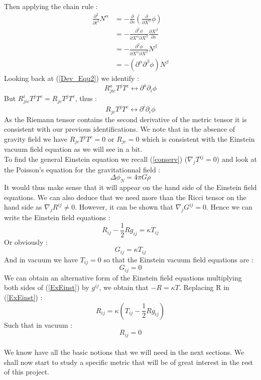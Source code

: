 \documentclass[a4paper,12pt]{article}
\theoremstyle{definition}
\begin{document}
Then applying the chain rule :
\begin{equation}
\begin{split}
	\frac{\partial^2}{\partial t^2}N^\alpha&=-\frac{\partial}{\partial s}(\frac{\partial}{\partial X^\alpha}\phi)\\
	&=-\frac{\partial^2\phi}{\partial X^\alpha\partial X^\beta}\frac{\partial X^\beta}{\partial s}\\
	&=-\frac{\partial^2\phi}{\partial X^\alpha\partial X^\beta}N^\beta\\
	&=-(\partial^\alpha \partial^\beta \phi)N^\beta
\end{split}
\end{equation}
Looking back at (\ref{Dev_Equ2}) we identify :
\begin{equation}
	R_{jic}^aT^jT^c\longleftrightarrow \partial^a \partial_i \phi
\end{equation}
But $R_{jic}^iT^jT^c=R_{jc}T^jT^c$, thus :
\begin{equation}
	R_{jc}T^jT^c\longleftrightarrow \partial^i \partial_i \phi
\end{equation}
As the Riemann tensor contains the second derivative of the metric tensor it is consistent with our previous identifications.
We note that in the absence of gravity field we have $R_{jc}T^jT^c=0$ or $R_{jc}=0$ which is consistent with the Einstein vacuum field equation as we will see in a bit.\\
To find the general Einstein equation we recall (\ref{conserv}) ($\nabla_j T^{ij}=0$) and look at the Poisson's equation for the gravitationnal field :
\begin{equation}
	\Delta\phi_N=4\pi G\rho
\end{equation}
It would thus make sense that it will appear on the hand side of the Einstein field equations.
We can also deduce that we need more than the Ricci tensor on the hand side as $\nabla_j R^{ij}\ne0$.
However, it can be shown that $\nabla_j G^{ij}=0$.
Hence we can write the Einstein field equations :
\begin{equation}\label{ExEinst}
	R_{ij}-\frac{1}{2}Rg_{ij}=\kappa T_{ij}
\end{equation}
Or obviously :
\begin{equation}
	G_{ij}=\kappa T_{ij}
\end{equation}
And in vacuum we have $T_{ij}=0$ so that the Einstein vacuum field equations are :
\begin{equation}
	G_{ij}=0
\end{equation}
We can obtain an alternative form of the Einstein field equations multiplying both sides of (\ref{ExEinst}) by $g^{ij}$, we obtain that $-R=\kappa T$.
Replacing R in (\ref{ExEinst}) :
\begin{equation}
	R_{ij}=\kappa(T_{ij}-\frac{1}{2}Rg_{ij})
\end{equation}
Such that in vacuum :
\begin{equation}
	R_{ij}=0
\end{equation}
\\We know have all the basic notions that we will need in the next sections.
We shall now start to study a specific metric that will be of great interest in the rest of this project.
\end{document}
